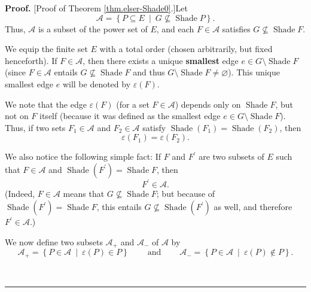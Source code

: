\documentclass[numbers=enddot,12pt,final,onecolumn]{scrartcl}%
\theoremstyle{definition}
\newenvironment{proof}[1][Proof]{\noindent\textbf{#1.} }{\ \rule{0.5em}{0.5em}}
\newenvironment{vershort}{}{}
\begin{document}
\begin{vershort}
\begin{proof}
[Proof of Theorem \ref{thm.elser-Shade0}.]Let
\begin{equation}
\mathcal{A}=\left\{  P\subseteq E\ \mid\ G\not \subseteq \operatorname*{Shade}%
P\right\}  . \label{pf.thm.elser-Shade0.short.A=}%
\end{equation}
Thus, $\mathcal{A}$ is a subset of the power set of $E$, and each
$F\in\mathcal{A}$ satisfies $G\not \subseteq \operatorname*{Shade}F$.

We equip the finite set $E$ with a total order (chosen arbitrarily, but fixed
henceforth). If $F\in\mathcal{A}$, then there exists a unique
\textbf{smallest} edge $e\in G\setminus\operatorname*{Shade}F$ (since
$F\in\mathcal{A}$ entails $G\not \subseteq \operatorname*{Shade}F$ and thus
$G\setminus\operatorname*{Shade}F\neq\varnothing$). This unique smallest edge
$e$ will be denoted by $\varepsilon\left(  F\right)  $.

We note that the edge $\varepsilon\left(  F\right)  $ (for a set
$F\in\mathcal{A}$) depends only on $\operatorname*{Shade}F$, but not on $F$
itself (because it was defined as the smallest edge $e\in G\setminus
\operatorname*{Shade}F$). Thus, if two sets $F_{1}\in\mathcal{A}$ and
$F_{2}\in\mathcal{A}$ satisfy $\operatorname*{Shade}\left(  F_{1}\right)
=\operatorname*{Shade}\left(  F_{2}\right)  $, then
\begin{equation}
\varepsilon\left(  F_{1}\right)  =\varepsilon\left(  F_{2}\right)  .
\label{pf.thm.elser-Shade0.short.eps=eps}%
\end{equation}


We also notice the following simple fact: If $F$ and $F^{\prime}$ are two
subsets of $E$ such that $F\in\mathcal{A}$ and $\operatorname*{Shade}\left(
F^{\prime}\right)  =\operatorname*{Shade}F$, then%
\begin{equation}
F^{\prime}\in\mathcal{A}. \label{pf.thm.elser-Shade0.short.Fpri}%
\end{equation}
(Indeed, $F\in\mathcal{A}$ means that $G\not \subseteq \operatorname*{Shade}%
F$; but because of $\operatorname*{Shade}\left(  F^{\prime}\right)
=\operatorname*{Shade}F$, this entails $G\not \subseteq \operatorname*{Shade}%
\left(  F^{\prime}\right)  $ as well, and therefore $F^{\prime}\in\mathcal{A}$.)

We now define two subsets $\mathcal{A}_{+}$ and $\mathcal{A}_{-}$ of
$\mathcal{A}$ by%
\[
\mathcal{A}_{+}=\left\{  P\in\mathcal{A}\ \mid\ \varepsilon\left(  P\right)
\in P\right\}  \ \ \ \ \ \ \ \ \ \ \text{and}\ \ \ \ \ \ \ \ \ \ \mathcal{A}%
_{-}=\left\{  P\in\mathcal{A}\ \mid\ \varepsilon\left(  P\right)  \notin
P\right\}  .
\]



\end{proof}
\end{vershort}
\end{document}
